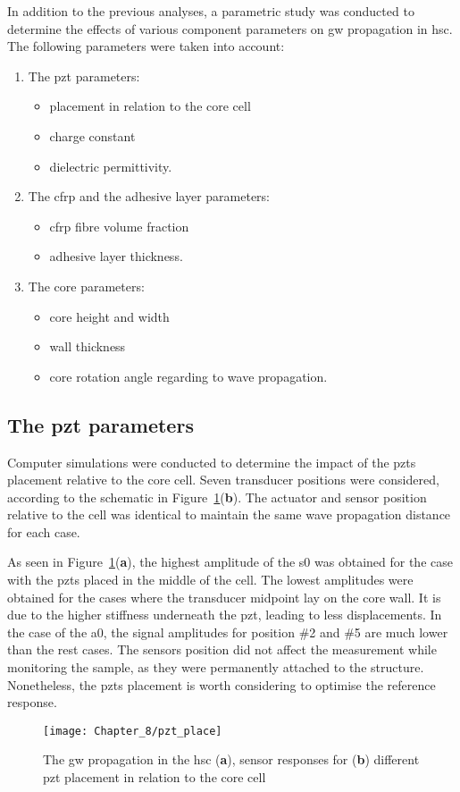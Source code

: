 \documentclass[11pt,a4paper,final]{report}
\theoremstyle{plain}
\begin{document}
In addition to the previous analyses, a parametric study was conducted to determine the effects of various component parameters on \ac{gw} propagation in \ac{hsc}. The following parameters were taken into account:
\begin{enumerate}
	\item The \ac{pzt} parameters:
	\begin{itemize}
		\item placement in relation to the core cell
		\item charge constant
		\item dielectric permittivity.
	\end{itemize}
	\item The \ac{cfrp} and the adhesive layer parameters:
		\begin{itemize}
		\item \ac{cfrp} fibre volume fraction
		\item adhesive layer thickness.
		\end{itemize}
	\item The core parameters:
	\begin{itemize}
		\item core height and width
		\item wall thickness
		\item core rotation angle regarding to wave propagation.
	\end{itemize}
\end{enumerate}

\subsection{The \acl{pzt} parameters}
Computer simulations were conducted to determine the impact of the \acp{pzt} placement relative to the core cell.
Seven transducer positions were considered, according to the schematic in Figure~\ref{fig:pzt_place}(\textbf{b}).
The actuator and sensor position relative to the cell was identical to maintain the same wave propagation distance for each case.

As seen in Figure~\ref{fig:pzt_place}(\textbf{a}), the highest amplitude of the \ac{s0} was obtained for the case with the \acp{pzt} placed in the middle of the cell.
The lowest amplitudes were obtained for the cases where the transducer midpoint lay on the core wall.
It is due to the higher stiffness underneath the \ac{pzt}, leading to less displacements.
In the case of the \ac{a0}, the signal amplitudes for position \#2 and \#5 are much lower than the rest cases.
The sensors position did not affect the measurement while monitoring the sample, as they were permanently attached to the structure. 
Nonetheless, the \acp{pzt} placement is worth considering to optimise the reference response.
\begin{figure}
	\begin{center}
		\texttt{[image: Chapter\_8/pzt\_place]}
	\end{center}
	\caption{The \acl{gw} propagation in the \acl{hsc} (\textbf{a}), sensor responses for (\textbf{b}) different \acf{pzt} placement in relation to the core cell}
	\label{fig:pzt_place}
\end{figure}
\end{document}
